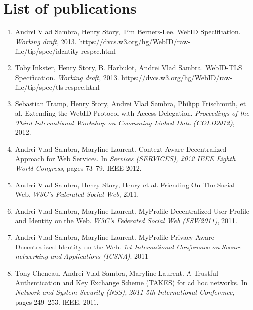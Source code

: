 \documentclass[a4paper]{book}
\begin{document}










\chapter*{List of publications}

\begin{enumerate}
\item Andrei Vlad Sambra, Henry Story, Tim Berners-Lee. WebID Specification. \textit{Working draft}, 2013. https://dvcs.w3.org/hg/WebID/raw-file/tip/spec/identity-respec.html

\item Toby Inkster, Henry Story, B. Harbulot, Andrei Vlad Sambra. WebID-TLS Specification. \textit{Working draft}, 2013.
https://dvcs.w3.org/hg/WebID/raw-file/tip/spec/tls-respec.html

\item Sebastian Tramp, Henry Story, Andrei Vlad Sambra, Philipp Frischmuth, et al. Extending the WebID Protocol with Access Delegation. \textit{Proceedings of the Third International Workshop on Consuming Linked Data (COLD2012)}, 2012.

\item Andrei Vlad Sambra, Maryline Laurent. Context-Aware Decentralized Approach for Web Services. In \textit{Services (SERVICES), 2012 IEEE Eighth World Congress}, pages 73--79. IEEE 2012.

\item Andrei Vlad Sambra, Henry Story, Henry et al. Friending On The Social Web. \textit{W3C's Federated Social Web}, 2011.

\item Andrei Vlad Sambra, Maryline Laurent. MyProfile-Decentralized User Profile and Identity on the Web. \textit{W3C's Federated Social Web (FSW2011)}, 2011.

\item Andrei Vlad Sambra, Maryline Laurent. MyProfile-Privacy Aware Decentralized Identity on the Web. \textit{1st International Conference on Secure networking and Applications (ICSNA)}. 2011

\item Tony Cheneau, Andrei Vlad Sambra, Maryline Laurent. A Trustful Authentication and Key Exchange Scheme (TAKES) for ad hoc networks. In \textit{Network and System Security (NSS), 2011 5th International Conference}, pages 249--253. IEEE, 2011.
\end{enumerate}







\end{document}
